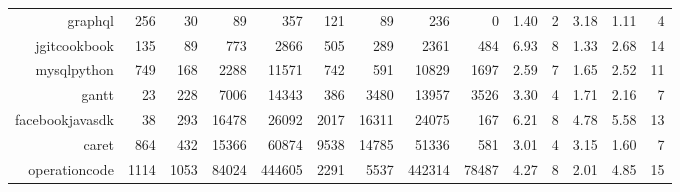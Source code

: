 \begin{table}[t]
{\begin{tabular}{rrrrrrrrrrrrrr}
graphql                 & 256     & 30    & 89                   & 357               & 121                             & 89                                 & 236                                        & 0                                             & 1.40              & 2            & 3.18         & 1.11                 & 4                 \\
jgitcookbook            & 135     & 89    & 773                  & 2866              & 505                             & 289                                & 2361                                       & 484                                           & 6.93              & 8            & 1.33         & 2.68                 & 14                \\
mysqlpython             & 749     & 168   & 2288                 & 11571             & 742                             & 591                                & 10829                                      & 1697                                          & 2.59              & 7            & 1.65         & 2.52                 & 11                \\
gantt                   & 23      & 228   & 7006                 & 14343             & 386                             & 3480                               & 13957                                      & 3526                                          & 3.30              & 4            & 1.71         & 2.16                 & 7                 \\
facebookjavasdk         & 38      & 293   & 16478                & 26092             & 2017                            & 16311                              & 24075                                      & 167                                           & 6.21              & 8            & 4.78         & 5.58                 & 13                \\
caret                   & 864     & 432   & 15366                & 60874             & 9538                            & 14785                              & 51336                                      & 581                                           & 3.01              & 4            & 3.15         & 1.60                 & 7                 \\
operationcode           & 1114    & 1053  & 84024                & 444605            & 2291                            & 5537                               & 442314                                     & 78487                                         & 4.27              & 8            & 2.01         & 4.85                 & 15               \\
\end{tabular}%
}
\end{table}
